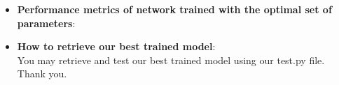 \begin{itemize}[topsep=-10pt]
\item \textbf{Performance metrics of network trained with the optimal set of parameters}:\\

  
\item \textbf{How to retrieve our best trained model}:\\
  You may retrieve and test our best trained model using our test.py file.
  Thank you.
\end{itemize}
  

